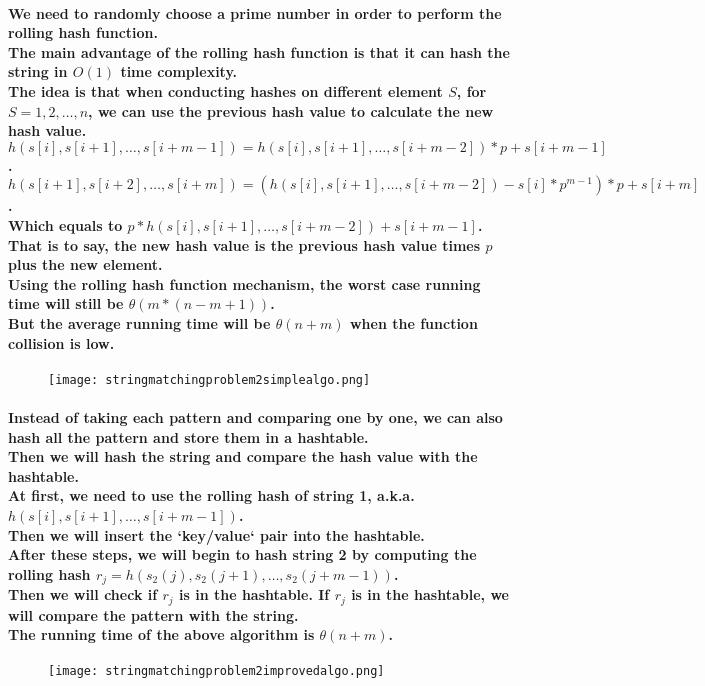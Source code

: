 \paragraph{
    We need to randomly choose a prime number in order to perform the rolling hash function.\\
    The main advantage of the rolling hash function is that it can hash the string in $O(1)$ time complexity.\\
    The idea is that when conducting hashes on different element $S$, for $S = 1, 2, \ldots, n$, 
    we can use the previous hash value to calculate the new hash value.\\
    $h(s[i], s[i+1], \ldots, s[i+m-1]) = h(s[i], s[i+1], \ldots, s[i+m-2]) * p + s[i+m-1]$.\\
    $h(s[i+1], s[i+2], \ldots, s[i+m]) = (h(s[i], s[i+1], \ldots, s[i+m-2]) - s[i]*p^{m-1})*p + s[i+m]$.\\
    Which equals to $p * h(s[i], s[i+1], \ldots, s[i+m-2]) + s[i+m-1]$.\\
    That is to say, the new hash value is the previous hash value times $p$ plus the new element.\\
    Using the rolling hash function mechanism, the worst case running time will still be $\theta(m*(n-m+1))$.\\
    But the average running time will be $\theta(n+m)$ when the function collision is low.\\
}

\begin{figure}[H]
    \texttt{[image: stringmatchingproblem2simplealgo.png]}
\end{figure}

\paragraph{
    Instead of taking each pattern and comparing one by one, we can also hash all the pattern and store them in a hashtable.\\
    Then we will hash the string and compare the hash value with the hashtable.\\
    At first, we need to use the rolling hash of string 1, a.k.a. $h(s[i], s[i+1], \ldots, s[i+m-1])$.\\
    Then we will insert the `key/value` pair into the hashtable.\\
    After these steps, we will begin to hash string 2 by computing the rolling hash 
    $r_j= h(s_2(j), s_2(j+1), \ldots, s_2(j+m-1))$.\\
    Then we will check if $r_j$ is in the hashtable. If $r_j$ is in the hashtable, we will compare the pattern with the string.\\
    The running time of the above algorithm is $\theta(n+m)$.\\
}

\begin{figure}[H]
    \texttt{[image: stringmatchingproblem2improvedalgo.png]}
\end{figure}